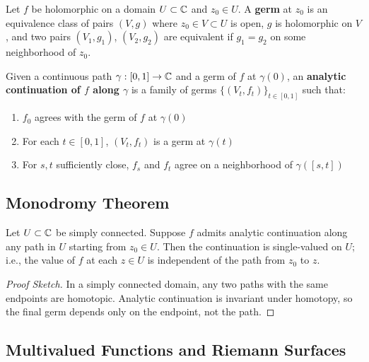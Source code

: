 \begin{definition}[Germ]\label{def:germ}
Let $f$ be holomorphic on a domain $U \subset \mathbb{C}$ and $z_0 \in U$. A \textbf{germ} at $z_0$ is an equivalence class of pairs $(V, g)$ where $z_0 \in V \subset U$ is open, $g$ is holomorphic on $V$, and two pairs $(V_1, g_1)$, $(V_2, g_2)$ are equivalent if $g_1 = g_2$ on some neighborhood of $z_0$.
\end{definition}

\begin{definition}\label{def:analytic-continuation}
Given a continuous path $\gamma: [0,1] \to \mathbb{C}$ and a germ of $f$ at $\gamma(0)$, an \textbf{analytic continuation of $f$ along $\gamma$} is a family of germs $\{(V_t, f_t)\}_{t \in [0,1]}$ such that:
\begin{enumerate}
\item $f_0$ agrees with the germ of $f$ at $\gamma(0)$
\item For each $t \in [0,1]$, $(V_t, f_t)$ is a germ at $\gamma(t)$
\item For $s, t$ sufficiently close, $f_s$ and $f_t$ agree on a neighborhood of $\gamma([s, t])$
\end{enumerate}
\end{definition}

\subsection{Monodromy Theorem}

\begin{theorem}\label{thm:monodromy}
Let $U \subset \mathbb{C}$ be simply connected. Suppose $f$ admits analytic continuation along any path in $U$ starting from $z_0 \in U$. Then the continuation is single-valued on $U$; i.e., the value of $f$ at each $z \in U$ is independent of the path from $z_0$ to $z$.
\end{theorem}

\begin{proof}[Proof Sketch]
In a simply connected domain, any two paths with the same endpoints are homotopic. Analytic continuation is invariant under homotopy, so the final germ depends only on the endpoint, not the path.
\end{proof}

\subsection{Multivalued Functions and Riemann Surfaces}

